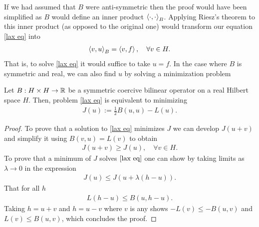 \documentclass[
    a4paper,
    DIV=14,
    abstract=true,
    numbers=noenddot
]{scrartcl}
\begin{document}
	If we had assumed that $B$ were anti-symmetric then the proof would have been simplified as $B$ would define an inner product  $\left\langle\cdot ,\cdot \right\rangle_B$. Applying Riesz's theorem to this inner product (as opposed to the original one) would transform our equation \eqref{lax eq} into
	\begin{align*}
		\left\langle v,u\right\rangle_B= \left\langle v,f\right\rangle , \quad\forall v\in H.
	\end{align*}
	That is, to solve \eqref{lax eq} it would suffice to take $u=f$. In the case where $B$ is symmetric and real, we can also find $u$ by solving a minimization problem
	\begin{proposition}
		Let $B: H\times H \to \mathbb{R}$ be a symmetric coercive bilinear operator on a real Hilbert space $H$. Then, problem  \eqref{lax eq} is equivalent to minimizing
		\begin{align*}
			J(u):= \frac{1}{2}B(u,u)-L(u) .
		\end{align*}
	\end{proposition}
	\begin{proof}
		To prove that a solution to \eqref{lax eq} minimizes $J$ we can develop  $J(u+v)$ and simplify it using  $B(v,u)=L(v)$ to obtain
		\begin{align*}
			J(u+v) \geq J(u) , \quad\forall  v \in H.
		\end{align*}
		To prove that a  minimum of $J$ solves  $\eqref{lax eq}$ one can show by taking limits as $\lambda  \to 0$ in the expression
		\begin{align*}
			J(u) \leq J(u+ \lambda (h-u)).
		\end{align*}
		That  for all $h $
		\begin{align*}
			L(h-u) \leq B(u,h-u).
		\end{align*}
		Taking $h=u+v$ and $h=u-v$ where $v$ is any shows  $-L(v) \leq -B(u,v)$ and $L(v) \leq B(u,v)$, which concludes the proof.
	\end{proof}
\end{document}
